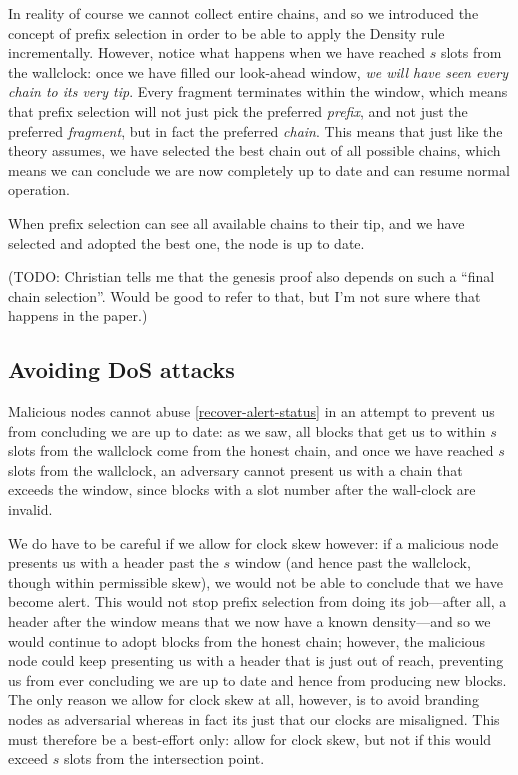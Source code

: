 In reality of course we cannot collect entire chains, and so we introduced
the concept of prefix selection in order to be able to apply the Density rule
incrementally. However, notice what happens when we have reached $s$ slots
from the wallclock: once we have filled our look-ahead window, \emph{we will
have seen every chain to its very tip}. Every fragment terminates within the
window, which means that prefix selection will not just pick the preferred
\emph{prefix}, and not just the preferred \emph{fragment}, but in fact the
preferred \emph{chain}. This means that just like the theory assumes, we have
selected the best chain out of all possible chains, which means we can
conclude we are now completely up to date and can resume normal operation.

\begin{definition}
\label{recover-alert-status}
When prefix selection can see all available chains to their tip, and we have
selected and adopted the best one, the node is up to date.
\end{definition}

(TODO: Christian tells me that the genesis proof also depends on
such a ``final chain selection''. Would be good to refer to that, but I'm
not sure where that happens in the paper.)

\subsection{Avoiding DoS attacks}
\label{genesis:becoming-alert:DoS}

Malicious nodes cannot abuse \cref{recover-alert-status} in an attempt to
prevent us from concluding we are up to date: as we saw, all blocks that get us
to within $s$ slots from the wallclock come from the honest chain, and once we
have reached $s$ slots from the wallclock, an adversary cannot present us with a
chain that exceeds the window, since blocks with a slot number after the
wall-clock are invalid.

We do have to be careful if we allow for clock skew however: if a malicious node
presents us with a header past the $s$ window (and hence past the wallclock,
though within permissible skew), we would not be able to conclude that we have
become alert. This would not stop prefix selection from doing its job---after
all, a header after the window means that we now have a known density---and so
we would continue to adopt blocks from the honest chain; however, the malicious
node could keep presenting us with a header that is just out of reach,
preventing us from ever concluding we are up to date and hence from producing
new blocks. The only reason we allow for clock skew at all, however, is to avoid
branding nodes as adversarial whereas in fact its just that our clocks are
misaligned. This must therefore be a best-effort only: allow for clock skew, but
not if this would exceed $s$ slots from the intersection point.

